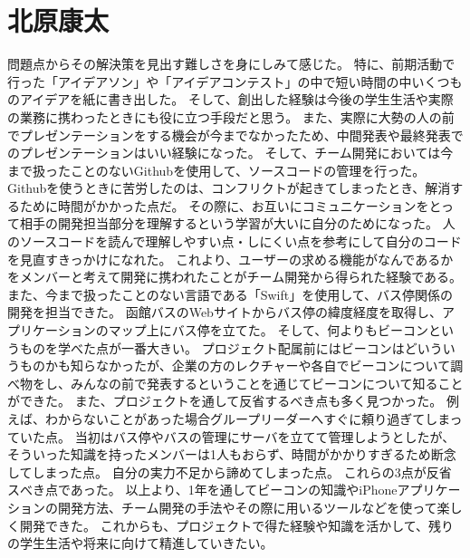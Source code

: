 \documentclass[openany,11pt,papersize]{jsbook}
\begin{document}

\section{北原康太}
問題点からその解決策を見出す難しさを身にしみて感じた。
特に、前期活動で行った「アイデアソン」や「アイデアコンテスト」の中で短い時間の中いくつものアイデアを紙に書き出した。
そして、創出した経験は今後の学生生活や実際の業務に携わったときにも役に立つ手段だと思う。
また、実際に大勢の人の前でプレゼンテーションをする機会が今までなかったため、中間発表や最終発表でのプレゼンテーションはいい経験になった。 
そして、チーム開発においては今まで扱ったことのないGithubを使用して、ソースコードの管理を行った。
Githubを使うときに苦労したのは、コンフリクトが起きてしまったとき、解消するために時間がかかった点だ。
その際に、お互いにコミュニケーションをとって相手の開発担当部分を理解するという学習が大いに自分のためになった。
人のソースコードを読んで理解しやすい点・しにくい点を参考にして自分のコードを見直すきっかけになれた。
これより、ユーザーの求める機能がなんであるかをメンバーと考えて開発に携われたことがチーム開発から得られた経験である。 
また、今まで扱ったことのない言語である「Swift」を使用して、バス停関係の開発を担当できた。
函館バスのWebサイトからバス停の緯度経度を取得し、アプリケーションのマップ上にバス停を立てた。
そして、何よりもビーコンというものを学べた点が一番大きい。
プロジェクト配属前にはビーコンはどいういうものかも知らなかったが、企業の方のレクチャーや各自でビーコンについて調べ物をし、みんなの前で発表するということを通じてビーコンについて知ることができた。
また、プロジェクトを通して反省するべき点も多く見つかった。
例えば、わからないことがあった場合グループリーダーへすぐに頼り過ぎてしまっていた点。
当初はバス停やバスの管理にサーバを立てて管理しようとしたが、そういった知識を持ったメンバーは1人もおらず、時間がかかりすぎるため断念してしまった点。
自分の実力不足から諦めてしまった点。
これらの3点が反省スべき点であった。
以上より、1年を通してビーコンの知識やiPhoneアプリケーションの開発方法、チーム開発の手法やその際に用いるツールなどを使って楽しく開発できた。 
これからも、プロジェクトで得た経験や知識を活かして、残りの学生生活や将来に向けて精進していきたい。 

\end{document}
